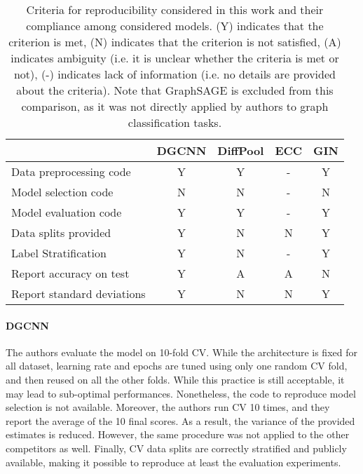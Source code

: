 \documentclass{article}
\begin{document}
\begin{table}[h]
\begin{center}
\caption{Criteria for reproducibility considered in this work and their compliance among considered models. (Y) indicates that the criterion is met, (N) indicates that the criterion is not satisfied, (A) indicates ambiguity (i.e. it is unclear whether the criteria is met or not), (-) indicates lack of information (i.e. no details are provided about the criteria). Note that GraphSAGE is excluded from this comparison, as it was not directly applied by authors to graph classification tasks.}
\label{tab:reproducibility}
\begin{tabular}{l c c c c}
    \toprule
    & \textbf{DGCNN} & \textbf{DiffPool} & \textbf{ECC} & \textbf{GIN}\\
    \midrule
    Data preprocessing code     & Y    & Y    & -     & Y \\ 
    Model selection code        & N    & N    & -     & N \\
    Model evaluation code       & Y    & Y    & -     & Y \\
    Data splits provided        & Y    & N    & N     & Y \\
    Label Stratification        & Y    & N    & -     & Y \\
    Report accuracy on test     & Y    & A    & A     & N \\
    Report standard deviations  & Y    & N    & N     & Y \\
    \bottomrule
\end{tabular}
\end{center}
\end{table}
\paragraph{DGCNN} The authors evaluate the model on 10-fold CV. While the architecture is fixed for all dataset, learning rate and epochs are tuned using only one random CV fold, and then reused on all the other folds. While this practice is still acceptable, it may lead to sub-optimal performances. Nonetheless, the code to reproduce model selection is not available. Moreover, the authors run CV 10 times, and they report the average of the 10 final scores. As a result, the variance of the provided estimates is reduced. However, the same procedure was not applied to the other competitors as well. Finally, CV data splits are correctly stratified and publicly available, making it possible to reproduce at least the evaluation experiments.
\end{document}
